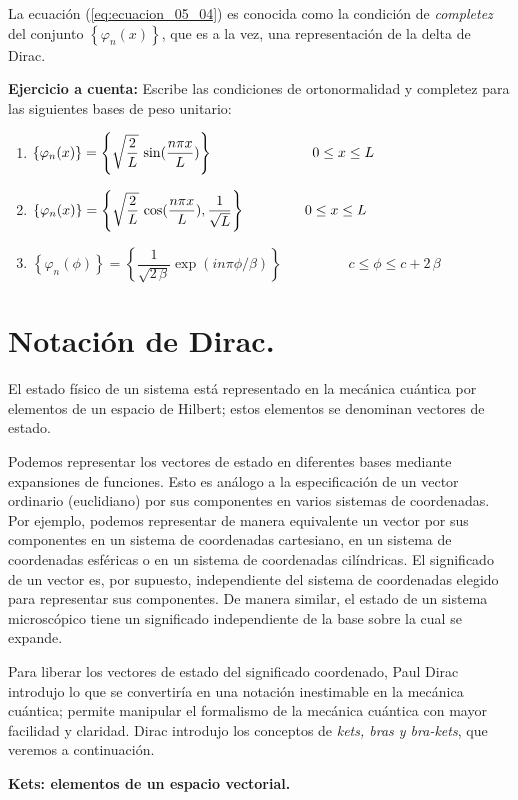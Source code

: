 La ecuación (\ref{eq:ecuacion_05_04}) es conocida como la condición de \emph{completez} del conjunto $\left\{ \varphi_{n} (x) \right\}$, que es a la vez, una representación de la delta de Dirac.
\par
\textbf{Ejercicio a cuenta: } Escribe las condiciones de ortonormalidad y completez para las siguientes bases de peso unitario:
\begin{enumerate}[label=\roman*)]
\item $\left\{ \varphi_{n} (x) \right\} = \left\{ \sqrt{\dfrac{2}{L}} \, \sin (\dfrac{n \pi x}{L}) \right\} \hspace{2.5cm} 0 \leq x \leq L$
\item $\left\{ \varphi_{n} (x) \right\} = \left\{ \sqrt{\dfrac{2}{L}} \, \cos (\dfrac{n \pi x}{L}), \dfrac{1}{\sqrt{L}} \right\} \hspace{1.5cm} 0 \leq x \leq L$
\item $\left\{ \varphi_{n} (\phi) \right\} = \left\{ \dfrac{1}{\sqrt{2 \, \beta}} \exp(i n \pi \phi / \beta) \right\} \hspace{2cm} c \leq \phi \leq c + 2 \, \beta$
\end{enumerate}
\newpage
\section{Notación de Dirac.}
El estado físico de un sistema está representado en la mecánica cuántica por elementos de un espacio de Hilbert; estos elementos se denominan vectores de estado. 
\par
Podemos representar los vectores de estado en diferentes bases mediante expansiones de funciones. Esto es análogo a la especificación de un vector ordinario (euclidiano) por sus componentes en varios sistemas de coordenadas. Por ejemplo, podemos representar de manera equivalente un vector por sus componentes en un sistema de coordenadas cartesiano, en un sistema de coordenadas esféricas o en un sistema de coordenadas cilíndricas. El significado de un vector es, por supuesto, independiente del sistema de coordenadas elegido para representar sus componentes. De manera similar, el estado de un sistema microscópico tiene un significado independiente de la base sobre la cual se expande.
\par
Para liberar los vectores de estado del significado coordenado, Paul Dirac introdujo lo que se convertiría en una notación inestimable en la mecánica cuántica; permite manipular el formalismo de la mecánica cuántica con mayor facilidad y claridad. Dirac introdujo los conceptos de \emph{kets, bras y bra-kets}, que veremos a continuación.
\par
\textbf{Kets: elementos de un espacio vectorial.}

